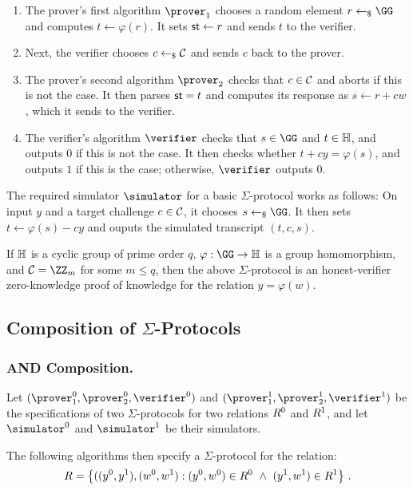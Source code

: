 \documentclass[runningheads]{llncs}
\begin{document}
\begin{enumerate}
  \item
    The prover's first algorithm $\prover_1$ chooses a random element $r\getsr\GG$ and computes $t\gets\varphi(r)$.
	It sets $\mathsf{st}\gets r$ and sends $t$ to the verifier.
  \item
    Next, the verifier chooses $c\gets_{\$}\mathcal{C}$ and sends $c$ back to the prover.
  \item
    The prover's second algorithm $\prover_2$ checks that $c\in\mathcal{C}$ and aborts if this is not the case.
	It then parses $\mathsf{st}=t$ and computes its response as $s\gets r+cw$, which it sends to the verifier.
  \item
    The verifier's algorithm $\verifier$ checks that $s\in\GG$ and $t\in\mathbb{H}$, and outputs $0$ if this is not the case.
	It then checks whether $t + cy = \varphi(s)$, and outputs $1$ if this is the case; otherwise, $\verifier$ outputs $0$.
\end{enumerate}

The required simulator $\simulator$ for a basic $\Sigma$-protocol works as follows:
On input $y$ and a target challenge $c\in\mathcal{C}$, it chooses $s\getsr\GG$.
It then sets $t \gets \varphi(s) - cy$ and ouputs the simulated transcript $(t,c,s)$.

\begin{theorem}
  If $\mathbb{H}$ is a cyclic group of prime order $q$, $\varphi:\GG\to\HH$ is a group homomorphism, and $\CS=\ZZ_m$ for some $m\leq q$, then the above $\Sigma$-protocol is an honest-verifier zero-knowledge proof of knowledge for the relation $y=\varphi(w)$.
\end{theorem}

\subsection{Composition of $\Sigma$-Protocols}
\subsubsection{AND Composition.}
  Let $(\prover_1^0,\prover_2^0,\verifier^0)$ and $(\prover_1^1,\prover_2^1,\verifier^1)$ be the specifications of two $\Sigma$-protocols for two relations $R^0$ and $R^1$, and let $\simulator^0$ and $\simulator^1$ be their simulators.

  The following algorithms then specify a $\Sigma$-protocol for the relation:
$$
  R = \left\{ ((y^0,y^1),(w^0,w^1) : (y^0,w^0)\in R^0 ~\land~ (y^1,w^1)\in R^1\right\}\,.
$$
  
\end{document}

